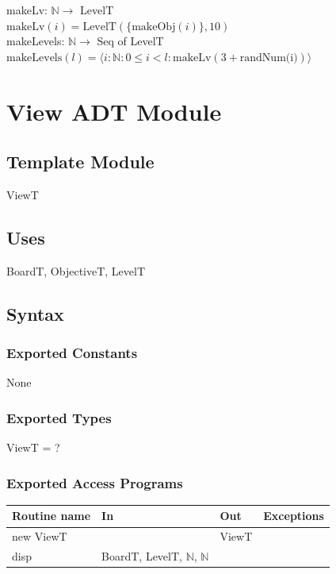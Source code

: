 \documentclass[12pt]{article}
\begin{document}
\noindent makeLv: $\mathbb{N} \rightarrow$ LevelT\\
\noindent $\mbox{makeLv}(i) = \mbox{LevelT}(\{ \mbox{makeObj}(i) \}, 10)$\\

\noindent makeLevels: $\mathbb{N} \rightarrow$ Seq of LevelT\\
\noindent $\mbox{makeLevels}(l) = \langle i : \mathbb{N} : 0 \le i < l : \mbox{makeLv}(3 + \mbox{randNum(i)}) \rangle$\\

\newpage

\section* {View ADT Module}

\subsection*{Template Module}

ViewT

\subsection* {Uses}

BoardT, ObjectiveT, LevelT

\subsection* {Syntax}

\subsubsection* {Exported Constants}

None

\subsubsection* {Exported Types}

ViewT = ?

\subsubsection* {Exported Access Programs}

\begin{tabular}{| l | l | l | l |}
	\hline
	\textbf{Routine name} & \textbf{In} & \textbf{Out} & \textbf{Exceptions}\\
	\hline
	new ViewT & ~ & ViewT & ~\\
	\hline
	disp & BoardT, LevelT, $\mathbb{N}$, $\mathbb{N}$ & ~ & ~\\
	\hline

\end{tabular}
\end{document}
